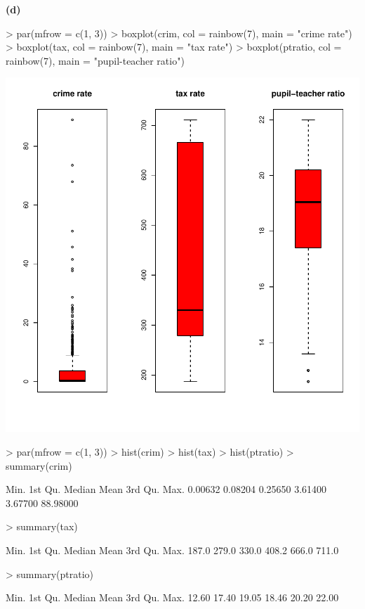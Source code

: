 \documentclass[a4paper]{article}
\renewcommand{\part}[1] {\vspace{.10in} {\bf (#1)}}
\begin{document}
\part{d}
\begin{Schunk}
\begin{Sinput}
> par(mfrow = c(1, 3))
> boxplot(crim, col = rainbow(7), main = "crime rate")
> boxplot(tax, col = rainbow(7), main = "tax rate")
> boxplot(ptratio, col = rainbow(7), main = "pupil-teacher ratio")
\end{Sinput}
\end{Schunk}
\includegraphics{lm-high}
\begin{Schunk}
\begin{Sinput}
> par(mfrow = c(1, 3))
> hist(crim)
> hist(tax)
> hist(ptratio)
> summary(crim)
\end{Sinput}
\begin{Soutput}
    Min.  1st Qu.   Median     Mean  3rd Qu.     Max. 
 0.00632  0.08204  0.25650  3.61400  3.67700 88.98000 
\end{Soutput}
\begin{Sinput}
> summary(tax)
\end{Sinput}
\begin{Soutput}
   Min. 1st Qu.  Median    Mean 3rd Qu.    Max. 
  187.0   279.0   330.0   408.2   666.0   711.0 
\end{Soutput}
\begin{Sinput}
> summary(ptratio)
\end{Sinput}
\begin{Soutput}
   Min. 1st Qu.  Median    Mean 3rd Qu.    Max. 
  12.60   17.40   19.05   18.46   20.20   22.00 
\end{Soutput}
\end{Schunk}
\end{document}
